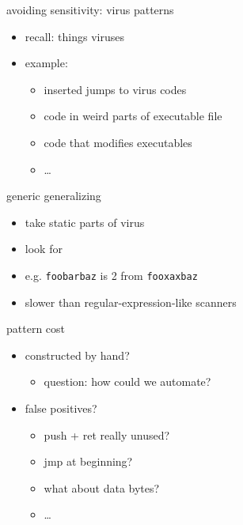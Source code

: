 

\begin{frame}{avoiding sensitivity: virus patterns}
    \begin{itemize}
    \item recall: things viruses 
    \item example: 
        \begin{itemize}
        \item inserted jumps to virus codes
        \item code in weird parts of executable file
        \item code that modifies executables
        \item \ldots
        \end{itemize}
    \end{itemize}
\end{frame}

\begin{frame}{generic generalizing}
    \begin{itemize}
    \item take static parts of virus
    \item look for 
    \item e.g. {\tt foobarbaz} is 2 from {\tt fooxaxbaz}
    \item slower than regular-expression-like scanners
    \end{itemize}
\end{frame}

\begin{frame}{pattern cost}
    \begin{itemize}
    \item constructed by hand?
        \begin{itemize}
        \item question: how could we automate?
        \end{itemize}
    \item false positives?
        \begin{itemize}
        \item push + ret really unused?
        \item jmp at beginning?
        \item what about data bytes?
        \item \ldots
        \end{itemize}
    \end{itemize}
\end{frame}
